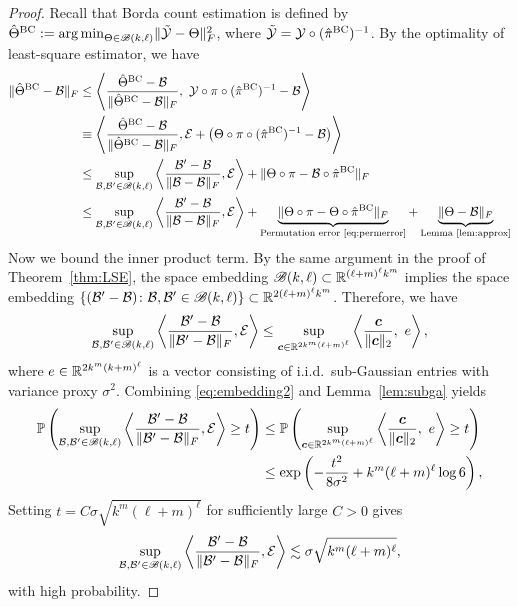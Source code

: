 \documentclass[12pt]{article}
\theoremstyle{definition}
\def\caliB{\mathscr{B}}
\begin{document}
\begin{proof}
    Recall that Borda count estimation is defined by $\hat\Theta^{\textup{BC}} := \argmin_{\Theta\in\caliB(k,\ell)}\FnormSize{}{\tilde\tY-\Theta}^2$, where $\tilde{\mathcal{Y}} = \mathcal{Y}\circ(\hat\pi^{\textup{BC}})^{-1}$.
     By the optimality of least-square estimator, we have
\begin{align}
\FnormSize{}{\hat\Theta^\textup{BC} -\tB}&\leq \left\langle {\hat \Theta^\textup{BC}-\tB \over \FnormSize{}{ \hat \Theta^\textup{BC}-\tB}},\ \tY\circ\pi\circ(\hat\pi^{\textup{BC}})^{-1}-\tB \right \rangle\\ &\equiv \left\langle {\hat \Theta^\textup{BC}-\tB \over \FnormSize{}{ \hat \Theta^\textup{BC}-\tB}},\tE+
\left(\Theta\circ\pi\circ(\hat\pi^{\textup{BC}})^{-1}-\tB\right) \right \rangle \\
&\leq \sup_{\tB, \tB'\in \caliB(k,\ell)} \left\langle {\tB'-\tB \over \FnormSize{}{\tB-\tB}}, \tE \right \rangle+\FnormSize{}{\Theta\circ \pi-\tB\circ \hat\pi^{\textup{BC}}}\\&\leq \sup_{\tB, \tB'\in \caliB(k,\ell)} \left\langle {\tB'-\tB \over \FnormSize{}{\tB-\tB}}, \tE \right \rangle+\underbrace{\FnormSize{}{\Theta\circ \pi-\Theta\circ \hat\pi^{\textup{BC}}}}_{\textup{Permutation error \eqref{eq:permerror}}}+\underbrace{\FnormSize{}{\Theta-\tB}}_{\textup{Lemma~\ref{lem:approx}}}
\end{align}
Now we bound the inner product term. 
 By the same argument in the proof of Theorem~\ref{thm:LSE}, the space embedding $\caliB(k,\ell)\subset \bbR^{(\ell+m)^\ell k^m}$ implies the space embedding $\{(\tB'-\tB)\colon \tB, \tB'\in\caliB(k,\ell)\} \subset\bbR^{2(\ell+m)^\ell k^m}$.
Therefore, we have 
\begin{align}\label{eq:embedding2}
\sup_{\tB, \tB'\in \caliB(k,\ell)} \left\langle {\tB'-\tB \over \FnormSize{}{\tB'-\tB}}, \tE \right \rangle \leq \sup_{\mc\in \bbR^{2k^m(\ell+m)^\ell } }\left\langle {\mc\over \vnormSize{}{\mc}},\ e \right\rangle,
\end{align}
where  $e\in\mathbb{R}^{2k^m(k+m)^\ell}$ is a vector consisting of i.i.d.\ sub-Gaussian entries with variance proxy $\sigma^2$. 
Combining \eqref{eq:embedding2} and Lemma~\ref{lem:subga} yields 
\begin{align}
    \mathbb{P}\left(\sup_{\tB, \tB'\in \caliB(k,\ell)} \left\langle {\tB'-\tB \over \FnormSize{}{\tB'-\tB}}, \tE \right \rangle\geq t\right)
    &\leq \mathbb{P}\left( \sup_{\mc\in \bbR^{2k^m(\ell+m)^\ell } }\left\langle {\mc\over \vnormSize{}{\mc}},\ e \right\rangle\geq t\right)\\&\leq \exp\left(-\frac{t^2}{8\sigma^2} +k^m(\ell+m)^\ell\log 6 \right),
\end{align}
Setting $t = C\sigma\sqrt{k^m(\ell+m)^\ell}$ for sufficiently large $C>0$ gives
\begin{align}\label{eq:nonparae}
    \sup_{\tB, \tB'\in \caliB(k,\ell)} \left\langle {\tB'-\tB \over \FnormSize{}{\tB'-\tB}}, \tE \right \rangle\lesssim \sigma\sqrt{k^m(\ell+m)^\ell},
\end{align}
with high probability.


\end{proof}
\end{document}
